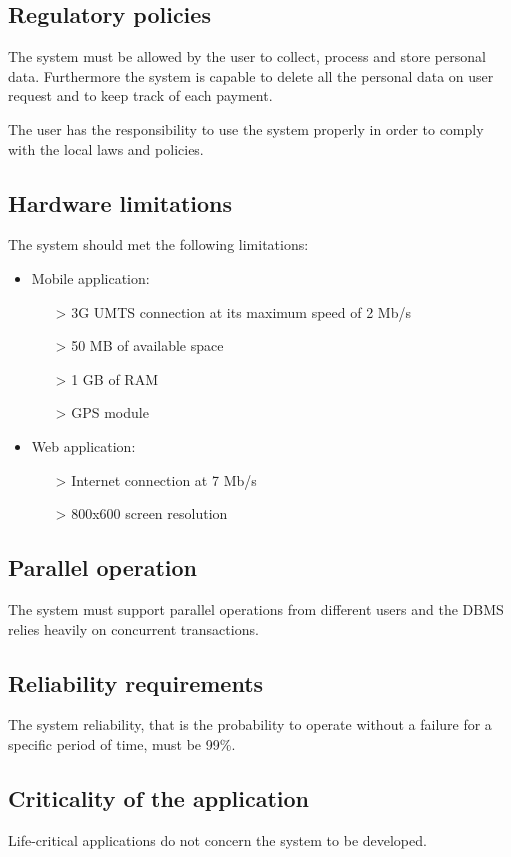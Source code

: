 \subsection{Regulatory policies}
The system must be allowed by the user to collect, process and store personal data. Furthermore the system is capable to delete all the personal data on user request and to keep track of each payment.

The user has the responsibility to use the system properly in order to comply with the local laws and policies.

\subsection{Hardware limitations}
The system should met the following limitations:
\begin{itemize}
\item Mobile application:
	\begin{itemize}
	\item[>] 3G UMTS connection at its maximum speed of 2 Mb/s
	\item[>] 50 MB of available space
	\item[>] 1 GB of RAM
	\item[>] GPS module
	\end{itemize}
\item Web application:
	\begin{itemize}
	\item[>] Internet connection at 7 Mb/s
	\item[>] 800x600 screen resolution
	\end{itemize}
\end{itemize}

\subsection{Parallel operation}
The system must support parallel operations from different users and the DBMS relies heavily on concurrent transactions.

\subsection{Reliability requirements}
The system reliability, that is the probability to operate without a failure for a specific period of time, must be 99\%.

\subsection{Criticality of the application}
Life-critical applications do not concern the system to be developed.